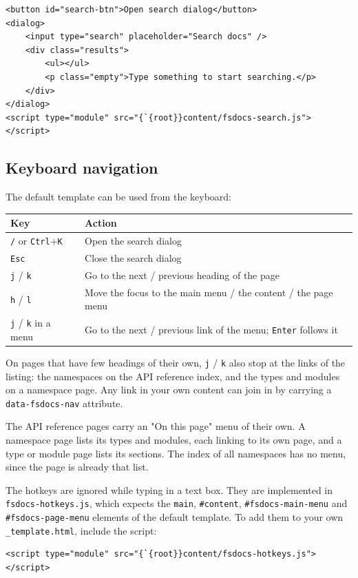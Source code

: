 \documentclass{article}
\begin{document}
\begin{lstlisting}
<button id="search-btn">Open search dialog</button>
<dialog>
    <input type="search" placeholder="Search docs" />
    <div class="results">
        <ul></ul>
        <p class="empty">Type something to start searching.</p>
    </div>
</dialog>
<script type="module" src="{`{root}}content/fsdocs-search.js"></script>

\end{lstlisting}
\subsection*{Keyboard navigation}



The default template can be used from the keyboard:
\begin{tabular}{|l|l|}\hline
\textbf{Key} & \textbf{Action}\\ \hline\hline
\texttt{/} or \texttt{Ctrl}+\texttt{K} & Open the search dialog\\ \hline
\texttt{Esc} & Close the search dialog\\ \hline
\texttt{j} / \texttt{k} & Go to the next / previous heading of the page\\ \hline
\texttt{h} / \texttt{l} & Move the focus to the main menu / the content / the page menu\\ \hline
\texttt{j} / \texttt{k} in a menu & Go to the next / previous link of the menu; \texttt{Enter} follows it\\ \hline
\end{tabular}



On pages that have few headings of their own, \texttt{j} / \texttt{k} also stop at the links of the listing: the namespaces on the
API reference index, and the types and modules on a namespace page. Any link in your own content can join in by
carrying a \texttt{data-fsdocs-nav} attribute.


The API reference pages carry an "On this page" menu of their own. A namespace page lists its types and modules, each
linking to its own page, and a type or module page lists its sections. The index of all namespaces has no menu, since
the page is already that list.


The hotkeys are ignored while typing in a text box. They are implemented in \texttt{fsdocs-hotkeys.js}, which expects the
\texttt{main}, \texttt{\#content}, \texttt{\#fsdocs-main-menu} and \texttt{\#fsdocs-page-menu} elements of the default template. To add them to your
own \texttt{\_template.html}, include the script:
\begin{lstlisting}
<script type="module" src="{`{root}}content/fsdocs-hotkeys.js"></script>

\end{lstlisting}
\end{document}
